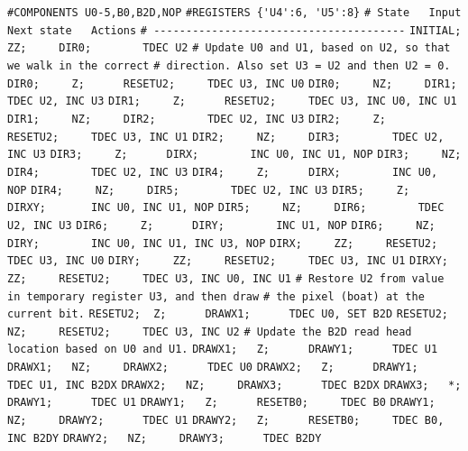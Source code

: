 \begin{apgsembly}
	\centering
	\begin{minipage}[t]{.49\textwidth}
		\begin{algorithmic}\tiny
			\State \verb|#COMPONENTS U0-5,B0,B2D,NOP|
			\State \verb|#REGISTERS {'U4':6, 'U5':8}|
			\State \verb|# State   Input   Next state   Actions|
			\State \verb|# ---------------------------------------|
			\State \verb|INITIAL;  ZZ;     DIR0;        TDEC U2|
			\State
			\State \verb|# Update U0 and U1, based on U2, so that we walk in the correct|
			\State \verb|# direction. Also set U3 = U2 and then U2 = 0.|
			\State \verb|DIR0;     Z;      RESETU2;     TDEC U3, INC U0|
			\State \verb|DIR0;     NZ;     DIR1;        TDEC U2, INC U3|
			\State \verb|DIR1;     Z;      RESETU2;     TDEC U3, INC U0, INC U1|
			\State \verb|DIR1;     NZ;     DIR2;        TDEC U2, INC U3|
			\State \verb|DIR2;     Z;      RESETU2;     TDEC U3, INC U1|
			\State \verb|DIR2;     NZ;     DIR3;        TDEC U2, INC U3|
			\State \verb|DIR3;     Z;      DIRX;        INC U0, INC U1, NOP|
			\State \verb|DIR3;     NZ;     DIR4;        TDEC U2, INC U3|
			\State \verb|DIR4;     Z;      DIRX;        INC U0, NOP|
			\State \verb|DIR4;     NZ;     DIR5;        TDEC U2, INC U3|
			\State \verb|DIR5;     Z;      DIRXY;       INC U0, INC U1, NOP|
			\State \verb|DIR5;     NZ;     DIR6;        TDEC U2, INC U3|
			\State \verb|DIR6;     Z;      DIRY;        INC U1, NOP|
			\State \verb|DIR6;     NZ;     DIRY;        INC U0, INC U1, INC U3, NOP|
			\State \verb|DIRX;     ZZ;     RESETU2;     TDEC U3, INC U0|
			\State \verb|DIRY;     ZZ;     RESETU2;     TDEC U3, INC U1|
			\State \verb|DIRXY;    ZZ;     RESETU2;     TDEC U3, INC U0, INC U1|
			\State
			\State \verb|# Restore U2 from value in temporary register U3, and then draw|
			\State \verb|# the pixel (boat) at the current bit.|
			\State \verb|RESETU2;  Z;      DRAWX1;      TDEC U0, SET B2D|
			\State \verb|RESETU2;  NZ;     RESETU2;     TDEC U3, INC U2|
			\State
			\State \verb|# Update the B2D read head location based on U0 and U1.|
			\State \verb|DRAWX1;   Z;      DRAWY1;      TDEC U1|
			\State \verb|DRAWX1;   NZ;     DRAWX2;      TDEC U0|
			\State \verb|DRAWX2;   Z;      DRAWY1;      TDEC U1, INC B2DX|
			\State \verb|DRAWX2;   NZ;     DRAWX3;      TDEC B2DX|
			\State \verb|DRAWX3;   *;      DRAWY1;      TDEC U1|
			\State \verb|DRAWY1;   Z;      RESETB0;     TDEC B0|
			\State \verb|DRAWY1;   NZ;     DRAWY2;      TDEC U1|
			\State \verb|DRAWY2;   Z;      RESETB0;     TDEC B0, INC B2DY|
			\State \verb|DRAWY2;   NZ;     DRAWY3;      TDEC B2DY|

\end{algorithmic}
\end{minipage}
\end{apgsembly}
